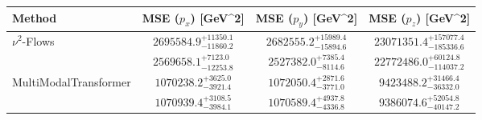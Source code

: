     \begin{tabular}{lccc}
        \toprule
        Method & MSE ($p_x$) [GeV^2] & MSE ($p_y$) [GeV^2] & MSE ($p_z$) [GeV^2] \\
        \midrule
         \multirow{2}{*}{$\nu^2$-Flows}& $2695584.9_{-11860.2}^{+11350.1}$ & $2682555.2_{-15894.6}^{+15989.4}$ & $23071351.4_{-185336.6}^{+157077.4}$ \\
         & $2569658.1_{-12253.8}^{+7123.0}$ & $2527382.0_{-8114.6}^{+7385.4}$ & $22772486.0_{-114037.2}^{+60124.8}$ \\
        \midrule
         \multirow{2}{*}{MultiModalTransformer}& $1070238.2_{-3921.4}^{+3625.0}$ & $1072050.4_{-3771.0}^{+2871.6}$ & $9423488.2_{-36332.0}^{+31466.4}$ \\
         & $1070939.4_{-3984.1}^{+3108.5}$ & $1070589.4_{-4336.8}^{+4937.8}$ & $9386074.6_{-40147.2}^{+52054.8}$ \\
        \bottomrule
    \end{tabular}